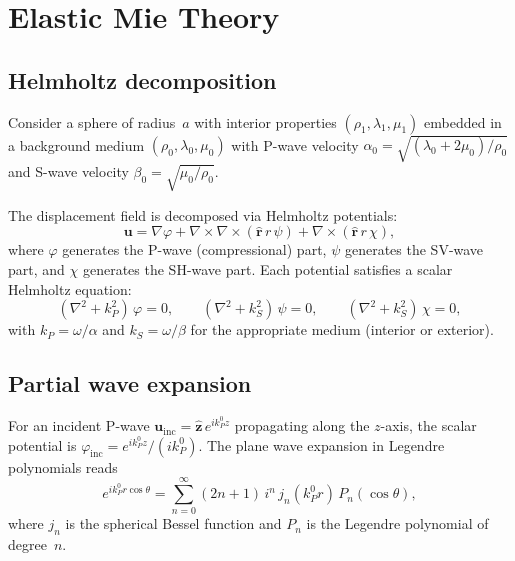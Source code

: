 \documentclass[11pt,a4paper]{article}
\newcommand{\bu}{\mathbf{u}}
\begin{document}
\section{Elastic Mie Theory}
\label{sec:mie}

\subsection{Helmholtz decomposition}

Consider a sphere of radius~$a$ with interior properties
$(\rho_1, \lambda_1, \mu_1)$ embedded in a background medium
$(\rho_0, \lambda_0, \mu_0)$ with P-wave velocity
$\alpha_0 = \sqrt{(\lambda_0 + 2\mu_0)/\rho_0}$ and S-wave velocity
$\beta_0 = \sqrt{\mu_0/\rho_0}$.

The displacement field is decomposed via Helmholtz potentials:
\begin{equation}
  \bu = \nabla\varphi + \nabla \times \nabla \times (\hat{\mathbf{r}}\,r\,\psi)
    + \nabla \times (\hat{\mathbf{r}}\,r\,\chi),
  \label{eq:helmholtz}
\end{equation}
where $\varphi$ generates the P-wave (compressional) part, $\psi$
generates the SV-wave part, and $\chi$ generates the SH-wave part.
Each potential satisfies a scalar Helmholtz equation:
\begin{equation}
  (\nabla^2 + k_P^2)\,\varphi = 0, \qquad
  (\nabla^2 + k_S^2)\,\psi = 0, \qquad
  (\nabla^2 + k_S^2)\,\chi = 0,
  \label{eq:helmholtz_eq}
\end{equation}
with $k_P = \omega/\alpha$ and $k_S = \omega/\beta$ for the
appropriate medium (interior or exterior).

\subsection{Partial wave expansion}

For an incident P-wave $\bu_\text{inc} = \hat{\mathbf{z}}\,
e^{ik_P^0 z}$ propagating along the $z$-axis, the scalar potential
is $\varphi_\text{inc} = e^{ik_P^0 z}/(ik_P^0)$.  The plane wave
expansion in Legendre polynomials reads
\begin{equation}
  e^{ik_P^0 r\cos\theta}
  = \sum_{n=0}^{\infty} (2n+1)\,i^n\,j_n(k_P^0 r)\,P_n(\cos\theta),
  \label{eq:plane_wave}
\end{equation}
where $j_n$ is the spherical Bessel function and $P_n$ is the Legendre
polynomial of degree~$n$.
\end{document}
